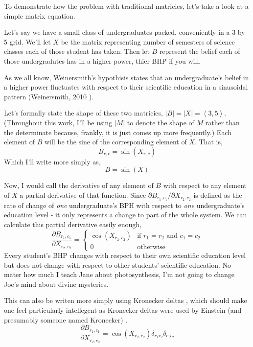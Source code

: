 \documentclass[12pt]{book}
\theoremstyle{plain}
\theoremstyle{definition}
\theoremstyle{ppart}
\theoremstyle{case}
\theoremstyle{solution}
\newcommand{\shape}[1]{\left|#1\right|}
\begin{document}
To demonstrate how the problem with traditional matricies, let's take a look at a
simple matrix equation. 

Let's say we have a small class of undergraduates packed, conveniently in a 3 by 5
grid. We'll let $X$ be the matrix representing number of semesters of science
classes each of those student has taken.
Then let $B$ represent the belief each of those undergradutes has in a higher power,
thier BHP if you will.

As we all know, Weinersmith's hypothisis states that an undergraduate's belief in a
higher power fluctuates with respect to their scientific education in a sinusoidal
pattern (Weinersmith, 2010 \cite{weinersmith:education}).

Let's formally state the shape of these two matricies,
$\shape{B} = \shape{X} = \left< 3,5 \right>$. (Throughout this work, I'll be using
$\shape{M}$ to denote the shape of $M$ rather than the determinate because, frankly, it
is just comes up more frequently.)
Each element of $B$ will be the sine of the corresponding element of
$X$. That is, \[B_{r,c} = \sin(X_{r,c})\]
Which I'll write more simply as, \[B = \sin(X)\]

Now, I would call the derivative of any element of $B$ with respect to any element
of $X$ a partial derivative of that function. Since
$\partial B_{r_1, c_1}/\partial X_{r_2, c_2}$ is defined as the rate of change of
\textit{one} undergraduate's BPH with respect to \textit{one}
undergraduate's education level - it only represents a change to part of the whole
system. 
We can calculate this partial derivative easily enough,
\[
\frac{\partial B_{r_1,c_1}}{\partial X_{r_2,c_2}} = 
\left\{
  \begin{array}{ll}
    \cos(X_{r_2,c_2})  & \mbox{if } r_1 = r_2 \mbox{ and } c_1 = c_2 \\
    0 & \mbox{otherwise}
  \end{array}
\right.
\]
Every student's BHP changes with respect to their own
scientific education level but does not change with respect to other students'
scientific education. No mater how much I teach Jane about photosynthesis, I'm
not going to change Joe's mind about divine mysteries.

This can also be writen more simply using Kronecker deltas \cite{wiki:kronecker},
which should make one feel particularly intellegent as Kronecker deltas were used
by Einstein (and presumably someone named Kronecker) \cite{wiki:einstein}.
\[
\frac{\partial B_{r_1,c_1}}{\partial X_{r_2,c_2}} = 
\cos (X_{r_2, c_2}) \delta_{r_1 r_2} \delta_{c_1 c_2}
\]
\end{document}
